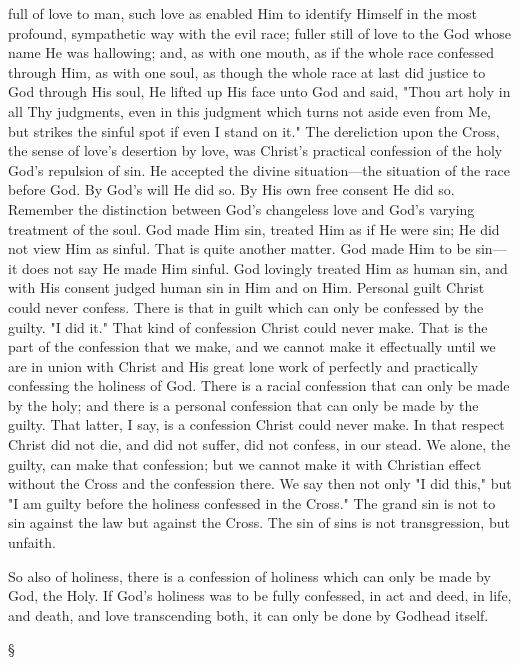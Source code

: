 \documentclass[12pt,letterpaper,oneside]{book}
\begin{document}
full of love to man, such love as enabled Him 
to identify Himself in the most profound, sympathetic 
way with the evil race; fuller still of 
love to the God whose name He was hallowing; 
and, as with one mouth, as if the whole race 
confessed through Him, as with one soul, as 
though the whole race at last did justice to God 
through His soul, He lifted up His face unto 
God and said, "Thou art holy in all Thy judgments, 
even in this judgment which turns not 
aside even from Me, but strikes the sinful spot if 
even I stand on it." The dereliction upon the 
Cross, the sense of love's desertion by love, was 
Christ's practical confession of the holy God's 
repulsion of sin. He accepted the divine situation---the 
situation of the race before God. By 
God's will He did so. By His own free consent 
He did so. Remember the distinction between 
God's changeless love and God's varying treatment 
of the soul. God made Him sin, treated 
Him as if He were sin; He did not view Him as 
sinful. That is quite another matter. God made 
Him to be sin---it does not say He made Him sinful. 
God lovingly treated Him as human sin, and 
with His consent judged human sin in Him and 
on Him. Personal guilt Christ could never confess. 
There is that in guilt which can only be 
confessed by the guilty. "I did it." That kind 
of confession Christ could never make. That is 
the part of the confession that we make, and we 
cannot make it effectually until we are in union 
with Christ and His great lone work of perfectly 
and practically confessing the holiness 
of God. There is a racial confession that can 
only be made by the holy; and there is a personal 
confession that can only be made by the 
guilty. That latter, I say, is a confession Christ 
could never make. In that respect Christ did 
not die, and did not suffer, did not confess, in 
our stead. We alone, the guilty, can make 
that confession; but we cannot make it with 
Christian effect without the Cross and the 
confession there. We say then not only "I did 
this," but "I am guilty before the holiness 
confessed in the Cross." The grand sin is 
not to sin against the law but against the 
Cross. The sin of sins is not transgression, 
but unfaith. 

So also of holiness, there is a confession of 
holiness which can only be made by God, the 
Holy. If God's holiness was to be fully confessed, 
in act and deed, in life, and death, and 
love transcending both, it can only be done by 
Godhead itself. 

\begin{center}
\S
\end{center}
\end{document}
